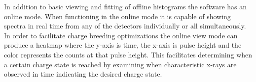 \documentclass[jon_ringuette_thesis_proposal.tex]{subfiles}
\begin{document}
    In addition to basic viewing and fitting of offline histograms the software has an online mode.
    When functioning in the online mode it is capable of showing spectra in real time from any of the detectors individually or all simultaneously.
    In order to facilitate charge breeding optimizations the online view mode can produce a heatmap where the y-axis is time, the x-axis is pulse height and the color represents the counts at that pulse height.
    This facilitates determining when a certain charge state is reached by examining when characteristic x-rays are observed in time indicating the desired charge state.


\end{document}
